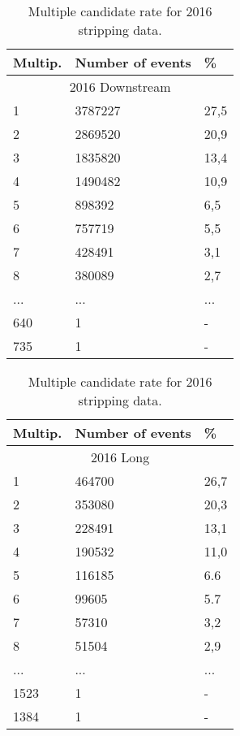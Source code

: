 \begin{table}[h!]
\begin{center}
\begin{tabular}{ p{2.6cm}p{3.1cm}p{0.6cm} }
\hline
\hline
Multip.  & Number of events & \% \\
\hline
    \multicolumn{3}{c}{2016 Downstream}\\
\hline
     1    & 3787227 & 27,5 \\
     2    & 2869520 & 20,9\\
     3    & 1835820 & 13,4 \\
     4    & 1490482 & 10,9 \\
     5    & 898392 & 6,5 \\
     6    & 757719 & 5,5 \\
     7    & 428491  & 3,1 \\
     8    & 380089  & 2,7 \\
    ...   &   ...  &  ... \\
    640   &    1 & -   \\
    735  &    1 & -    \\
     
\hline
\end{tabular}
\quad
\begin{tabular}{ p{2.6cm}p{3.1cm}p{0.6cm} }
\hline
\hline
Multip.  & Number of events & \% \\
\hline
    \multicolumn{3}{c}{2016 Long}\\
\hline
     1    & 464700 & 26,7 \\
     2    & 353080 & 20,3\\
     3    & 228491 & 13,1 \\
     4    & 190532 & 11,0 \\
     5    & 116185 & 6.6 \\
     6    & 99605 & 5.7 \\
     7    & 57310  & 3,2\\
     8    & 51504 & 2,9\\
    ...   &   ...  &  ... \\
    1523  &    1 & -   \\
    1384  &    1 & -    \\
     
\hline
\end{tabular}
\caption{Multiple candidate rate for 2016 stripping data.}
\label{tab:multi2016raw}
\end{center}
\end{table}%



